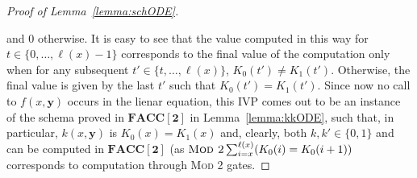 \documentclass[11pt, oneside]{article}
\newenvironment{toappendix}{}{}
\newcommand{\FACC}{\mathbf{FACC[2]}}
\newcommand{\tu}[1]{\mathbf{#1}}
\theoremstyle{definition}
\begin{document}
\begin{toappendix}
\begin{proof}[Proof of Lemma~\ref{lemma:schODE}]
\begin{itemize}
    \end{itemize}
and 0 otherwise.
It is easy to see that the value computed in this way for $t\in \{0,\dots, \ell(x)-1\}$ corresponds to the final value of the computation only when for any subsequent $t'\in \{t,\dots, \ell(x)\}$, $K_0(t')\neq K_1(t')$. Otherwise, the final value is given by the last $t'$ such that $K_0(t')=K_1(t')$. 
%
    Since now no call to $f(x, \tu y)$ occurs in the lienar equation, this IVP comes out to be an instance of the schema proved in $\FACC$ in Lemma~\ref{lemma:kkODE}, such that, in particular,  $k(x, \tu y)$ is $K_0(x)=K_1(x)$ and, clearly, both $k,k'\in \{0,1\}$ and can be computed in $\FACC$ (as $\textsc{Mod 2} \sum^{\ell(x)}_{i=x}(K_0(i) = K_0(i+1))$ corresponds to computation through \textsc{Mod 2} gates.


    
   


\end{proof}
\end{toappendix}
\end{document}
